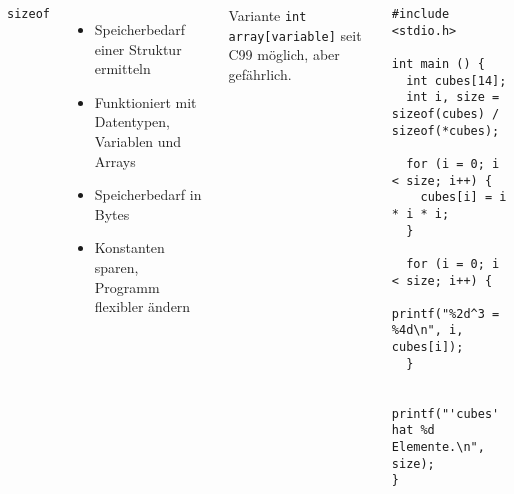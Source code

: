 \begin{frame}[fragile]
%
\begin{columns}[T]
\begin{Large}
{\texttt{sizeof}}
\vspace{6pt}
\end{Large}
%
\begin{itemize}
\item Speicherbedarf einer Struktur ermitteln
\item Funktioniert mit Datentypen, Variablen und Arrays
\item Speicherbedarf in Bytes
\item Konstanten sparen, Programm flexibler ändern
\end{itemize}
%
\begin{hintbox}
\footnotesize
Variante \texttt{int array[variable]} seit C99 möglich, aber gefährlich.
\end{hintbox}
%
%
\begin{codebox}
\begin{verbatim}
#include <stdio.h>

int main () {
  int cubes[14];
  int i, size = sizeof(cubes) / sizeof(*cubes);
  
  for (i = 0; i < size; i++) {
    cubes[i] = i * i * i;
  }
  
  for (i = 0; i < size; i++) {
    printf("%2d^3 = %4d\n", i, cubes[i]);
  }
  
  printf("'cubes' hat %d Elemente.\n", size);
}
\end{verbatim}
\end{codebox}
%
\end{columns}
%
\end{frame}


